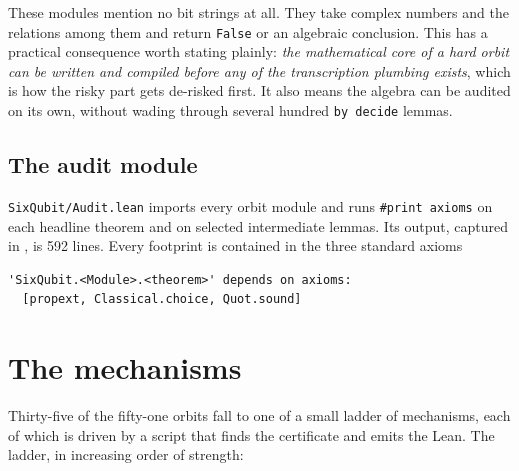 \documentclass[11pt,a4paper]{article}
\newcommand{\lean}[1]{\texttt{#1}}
\theoremstyle{definition}
\begin{document}
These modules mention no bit strings at all. They take complex numbers and the
relations among them and return \lean{False} or an algebraic conclusion. This has
a practical consequence worth stating plainly: \emph{the mathematical core of a
hard orbit can be written and compiled before any of the transcription
plumbing exists}, which is how the risky part gets de-risked first. It also means
the algebra can be audited on its own, without wading through several hundred
\lean{by decide} lemmas.

\subsection{The audit module}

\lean{SixQubit/Audit.lean} imports every orbit module and runs
\lean{\#print axioms} on each headline theorem and on selected intermediate
lemmas. Its output, captured in , is 592 lines.
Every footprint is contained in the three standard axioms
\begin{lstlisting}
'SixQubit.<Module>.<theorem>' depends on axioms:
  [propext, Classical.choice, Quot.sound]
\end{lstlisting}

\section{The mechanisms}

Thirty-five of the fifty-one orbits fall to one of a small ladder of
mechanisms, each of which is driven by a script that finds the certificate and
emits the Lean. The ladder, in increasing order of strength:
\end{document}

